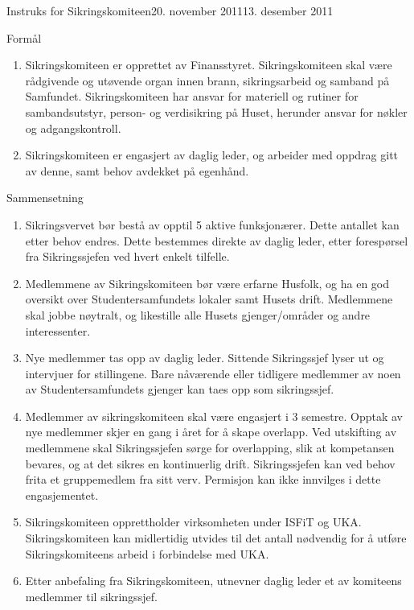 \begin{instruks}{Instruks for Sikringskomiteen}{20. november 2011}{13. desember 2011}
    \begin{instruksledd}{Formål}
        \begin{enumerate}
            \item  Sikringskomiteen er opprettet av Finansstyret. Sikringskomiteen skal
                være rådgivende og utøvende organ
                innen brann, sikringsarbeid og samband på Samfundet. Sikringskomiteen har ansvar
                for materiell og rutiner for sambandsutstyr, person-
                og verdisikring på Huset, herunder ansvar for nøkler og adgangskontroll.
            \item Sikringskomiteen er engasjert av daglig leder, og arbeider med oppdrag
                gitt av denne, samt behov avdekket
                på egenhånd.
        \end{enumerate}
    \end{instruksledd}

    \begin{instruksledd}{Sammensetning}
        \begin{enumerate}
            \item Sikringsvervet bør bestå av opptil 5 aktive funksjonærer. Dette antallet kan etter behov
                endres. Dette bestemmes
                direkte av daglig leder, etter forespørsel fra Sikringssjefen ved hvert enkelt
                tilfelle.
            \item Medlemmene av Sikringskomiteen bør være erfarne Husfolk, og ha en god oversikt over
                Studentersamfundets lokaler samt Husets drift. Medlemmene skal jobbe nøytralt, og
                likestille alle Husets
                gjenger/områder og andre interessenter.
            \item Nye medlemmer tas opp av daglig leder. Sittende Sikringssjef lyser ut og intervjuer
                for stillingene. Bare
                nåværende eller tidligere medlemmer av noen av Studentersamfundets gjenger kan taes
                opp som sikringssjef.
            \item Medlemmer av sikringskomiteen skal være engasjert i 3 semestre. Opptak av nye
                medlemmer skjer en gang i
                året for å skape overlapp. Ved utskifting av medlemmene skal Sikringssjefen sørge for
                overlapping, slik at
                kompetansen bevares, og at det sikres en kontinuerlig drift. Sikringssjefen kan ved
                behov frita et
                gruppemedlem fra sitt verv. Permisjon kan ikke innvilges i dette engasjementet.
	     \item Sikringskomiteen opprettholder virksomheten under ISFiT og UKA.
	        Sikringskomiteen kan midlertidig utvides til det antall nødvendig for å utføre
		Sikringskomiteens arbeid i forbindelse med UKA.
	     \item Etter anbefaling fra Sikringskomiteen, utnevner daglig leder et av komiteens
		medlemmer til sikringssjef.


\end{enumerate}
\end{instruksledd}
\end{instruks}
